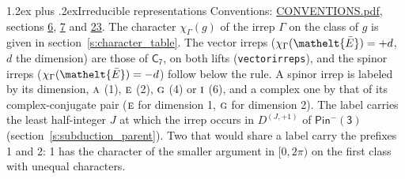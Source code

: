 \documentclass[10pt,a4paper]{article}
\makeatletter
\renewcommand\section{\@startsection{section}{1}{\z@}{-3ex plus -1ex minus -.2ex}%
  {1.2ex plus .2ex}{\normalfont\large\sffamily\bfseries\color{parttitle}}}
\numberwithin{equation}{section}
\newcommand{\eltfont}[1]{{\let\sigma\eltsigma\mathelt{#1}}}
\newcommand{\grp}[1]{\mathsf{#1}}
\newcommand{\irr}[1]{\text{\normalfont\scshape #1}}
\newcommand{\elt}[1]{\eltfont{#1}}
\newcommand{\irrJp}[2]{D^{(#1,#2)}}
\newcommand{\irchar}[1]{\chi_{#1}}
\newcommand{\barred}[1]{\bar{#1}}
\makeatother
\begin{document}
\section{Irreducible representations}\label{s:irreps}
Conventions: \href{../../CONVENTIONS.pdf}{CONVENTIONS.pdf}, sections \href{../../../rotation/CONVENTIONS.pdf\#conv.6}{6}, \href{../../../rotation/CONVENTIONS.pdf\#conv.7}{7} and \href{../../CONVENTIONS.pdf\#conv.23}{23}.
\leavevmode\label{n:function.character}\label{n:irrep.Gamma}The character $\irchar{\Gamma}(g)$ of the irrep $\Gamma$ on the class of $g$ is given in section~\ref{s:character_table}. \label{n:index.dimension}The vector irreps ($\irchar{\Gamma}(\elt{\barred{E}}) = +d$, $d$ the dimension) are those of \href{../../../rotation/data/pdf/C7.pdf}{$\grp{C_{7}}$}, on both lifts (\texttt{vectorirreps}), and the spinor irreps ($\irchar{\Gamma}(\elt{\barred{E}}) = -d$) follow below the rule. A spinor irrep is labeled by its dimension, $\irr{a}$ (1), $\irr{e}$ (2), $\irr{g}$ (4) or $\irr{i}$ (6), and a complex one by that of its complex-conjugate pair ($\irr{e}$ for dimension 1, $\irr{g}$ for dimension 2). The label carries the least half-integer $J$ at which the irrep occurs in $\irrJp{J}{+1}$ of $\grp{Pin^{-}(3)}$ (section~\ref{s:subduction_parent}). Two that would share a label carry the prefixes 1 and 2: 1 has the character of the smaller argument in $[0, 2\pi)$ on the first class with unequal characters.
\end{document}
